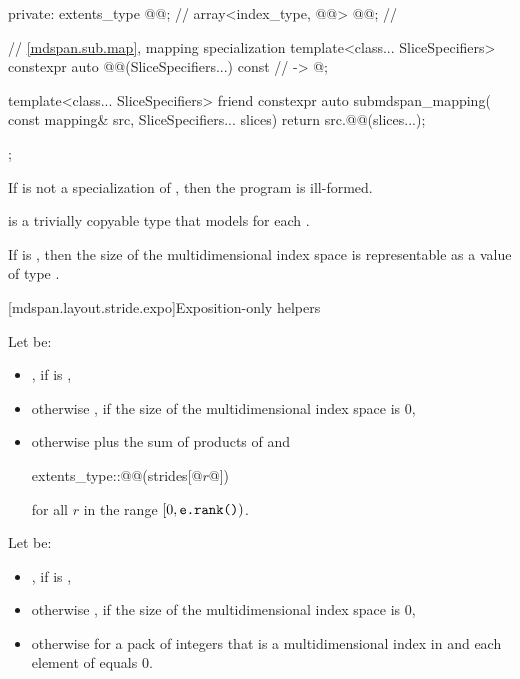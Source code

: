 \begin{codeblock}
{{  private:
    extents_type @@{};                    // \expos
    array<index_type, @@> @@{};        // \expos

    // \ref{mdspan.sub.map},  mapping specialization
    template<class... SliceSpecifiers>
      constexpr auto @@(SliceSpecifiers...) const       // \expos
        -> @\seebelow@;

    template<class... SliceSpecifiers>
      friend constexpr auto submdspan_mapping(
        const mapping& src, SliceSpecifiers... slices) {
          return src.@@(slices...);
      }
  };
}
\end{codeblock}

\pnum
If  is not a specialization of ,
then the program is ill-formed.

\pnum
{} is a trivially copyable type
that models  for each .

\pnum
\mandates
If  is ,
then the size of the multidimensional index space 
is representable as a value of type .

[mdspan.layout.stride.expo]{Exposition-only helpers}

\pnum
Let  be:
\begin{itemize}
\item
{}, if  is ,
\item
otherwise , if the size of the multidimensional index space  is 0,
\item
otherwise  plus the sum of products of
 and
\begin{codeblock}
extents_type::@@(strides[@$r$@])
\end{codeblock}
  for all $r$ in the range $[0, \texttt{\protect e.rank()})$.
\end{itemize}

\pnum
Let  be:
\begin{itemize}
\item
{}, if  is ,
\item
otherwise , if the size of the multidimensional index space  is 0,
\item
otherwise  for a pack of integers 
that is a multidimensional index in  and
each element of  equals 0.
\end{itemize}

